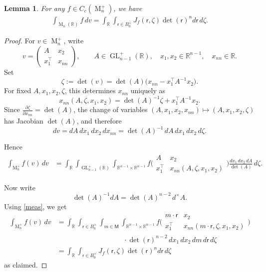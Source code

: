\documentclass[reqno,11pt]{amsart}
\numberwithin{equation}{section}
\newtheorem{lemma}[theorem]{Lemma}
\theoremstyle{definition}
\theoremstyle{remark}
\newcommand{\op}{\operatorname}
\newcommand{\R}{\mathbb R}
\newcommand{\br}{\mathbb R}
\newcommand{\M}{\op{M}}
\newcommand{\bp}{B_0^+}
\newcommand{\GL}{\op{GL}}
\renewcommand{\r}{\mathsf r}
\begin{document}
\begin{lemma}
\label{siegelJf}
For any $f\in C_c(\M_n^+)$, we have
\begin{align*}
\int_{\M_n(\br)}  f \, dv  = \int_\R \int_{\r\in \bp} J_f(\r, \zeta) \det(\r)^{n} {d\r} \, d\zeta.
\end{align*}
\end{lemma}
\begin{proof}
For $v\in \M_n^+$, write
$$
v=
\begin{pmatrix}
A & x_2\\
x_1^{\intercal} & x_{nn}
\end{pmatrix},
\qquad
A\in \GL_{n-1}^+(\R),\quad x_1,x_2\in \R^{n-1},\quad x_{nn}\in \R.
$$
Set
$$
\zeta:=\det(v)
=
\det(A)\bigl(x_{nn}-x_1^{\intercal}A^{-1}x_2\bigr).
$$
For fixed $A,x_1,x_2,\zeta$, this determines $x_{nn}$ uniquely as
$$
x_{nn}(A,\zeta,x_1,x_2)
=
\det(A)^{-1}\zeta+x_1^{\intercal}A^{-1}x_2.
$$
Since $\frac{\partial \zeta}{\partial x_{nn}}=\det(A)$,
the change of variables
$
(A,x_1,x_2,x_{nn})\mapsto (A,x_1,x_2,\zeta)$
has Jacobian $\det(A)$, and therefore
$$
dv=dA\,dx_1\,dx_2\,dx_{nn}
={\det(A)}^{-1}\,dA\,dx_1\,dx_2\,d\zeta.
$$

Hence
\begin{equation*}
\begin{aligned}
\int_{\M_n^+} f(v)\,dv
&=
\int_{\R}
\int_{\GL_{n-1}^+(\R)}
\int_{\R^{n-1}\times \R^{n-1}}
f\big(\begin{smallmatrix}
A & x_2\\
x_1^{\intercal} & x_{nn}(A,\zeta,x_1,x_2)
\end{smallmatrix}\big)
\tfrac{dx_1\,dx_2\,dA}{\det(A)}\,d\zeta.
\end{aligned}
\end{equation*}

Now write
$$
{\det(A)}^{-1} {dA}
=
\det(A)^{n-2}\,d^\times A.
$$
Using  \eqref{meas}, we get
$$
\begin{aligned}
\int_{\M_n^+} f(v)\,dv
&=
\int_{\R}
\int_{\r\in B_0^+}\int_{m\in\mathsf M}
\int_{\R^{n-1}\times \R^{n-1}}
f\big(\begin{smallmatrix}
m\cdot \r & x_2\\
x_1^{\intercal} & x_{nn}(m\cdot \r,\zeta,x_1,x_2)
\end{smallmatrix}\big)  \\
&\hspace{4cm}\cdot
\det(\r)^{n-2}\,dx_1\,dx_2\,dm\,d\r\,d\zeta
\\ & =\int_{\R}
\int_{\r\in B_0^+} 
J_f(\r,\zeta)
\det(\r)^{n} d\r\,d\zeta
\end{aligned}
$$
as claimed.
\end{proof}
\end{document}
